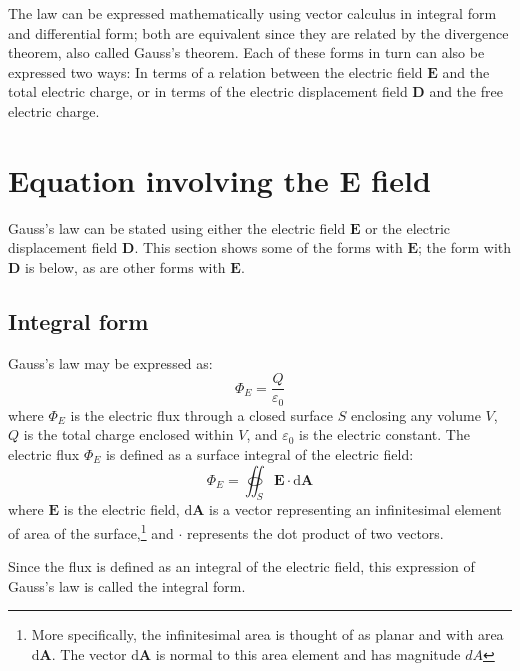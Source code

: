 \documentclass[a4paper]{article}
\begin{document}
The law can be expressed mathematically using vector calculus in integral form and differential form; both are equivalent since they are related by the divergence theorem, also called Gauss's theorem. Each of these forms in turn can also be expressed two ways: In terms of a relation between the electric field \(\mathbf{E}\) and the total electric charge, or in terms of the electric displacement field \(\mathbf{D}\) and the free electric charge.

\section{Equation involving the \(\mathbf{E}\) field} \label{sec:eqEfield}
Gauss's law can be stated using either the electric field \(\mathbf{E}\) or the electric displacement field \(\mathbf{D}\). This section shows some of the forms with \(\mathbf{E}\); the form with \(\mathbf{D}\) is below, as are other forms with \(\mathbf{E}\). 

\subsection{Integral form}
Gauss's law may be expressed as:
\[
    \Phi_E = \frac{Q}{\varepsilon_0}
\]
where \(\Phi_E\) is the electric flux through a closed surface \(S\) enclosing any volume \(V\), \(Q\) is the total charge enclosed within \(V\), and \(\varepsilon_0\) is the electric constant. The electric flux \(\Phi_E\) is defined as a surface integral of the electric field: 
\[
    \Phi_E = \oiint_S \mathbf{E} \cdot \mathrm{d} \mathbf{A}
\]
where \(\mathbf{E}\) is the electric field, \(\mathrm{d}\mathbf{A}\) is a vector representing an infinitesimal element of area of the surface,\footnote{More specifically, the infinitesimal area is thought of as planar and with area \(\mathrm{d}\mathbf{A}\). The vector \(\mathrm{d}\mathbf{A}\) is normal to this area element and has magnitude \(dA\)} and \(\cdot\) represents the dot product of two vectors.

Since the flux is defined as an integral of the electric field, this expression of Gauss's law is called the integral form. 
\end{document}
